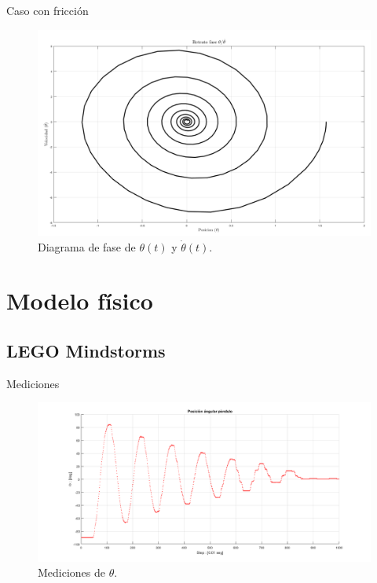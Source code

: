 \documentclass{beamer}
\begin{document}
\begin{frame}{Caso con fricción}
\begin{figure}[hb!]
 \centering 
 \includegraphics[scale=0.2]{../Report/img/faseF.png}
\caption{Diagrama de fase de $\theta(t)$ y $\dot{\theta}(t)$.}
 \label{fig: phase plot theta friction}
\end{figure}

\end{frame}


\section{Modelo físico}
\subsection{LEGO Mindstorms}

\begin{frame}{Mediciones}
 \begin{figure}[hb!]
 \centering
 \includegraphics[scale=0.3]{../Mindstorms/Pendulin2.png}
 \caption{Mediciones de $\theta$.}
 \label{fig: mindstorms theta}
\end{figure}
\end{frame}
\end{document}
